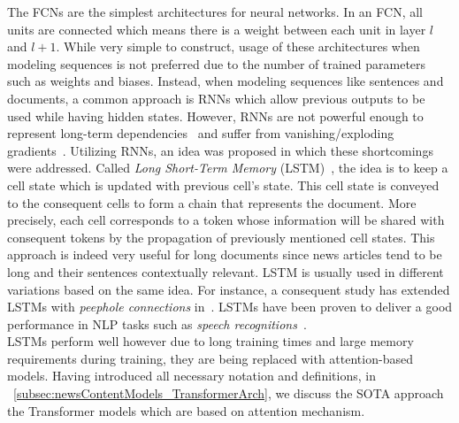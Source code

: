The FCNs are the simplest architectures for neural networks. In an FCN, all units are connected which means there is a weight between each unit in layer $l$ and $l+1$. While very simple to construct, usage of these architectures when modeling sequences is not preferred due to the number of trained parameters such as weights and biases. Instead, when modeling sequences like sentences and documents, a common approach is RNNs which allow previous outputs to be used while having hidden states. However, RNNs are not powerful enough to represent long-term dependencies~\parencite{LearningLongTermDependenciesHard_Bengio} and suffer from vanishing/exploding gradients~\parencite{OnTheDifficultyOfTrainingRNNs_Pascanu}. Utilizing RNNs, an idea was proposed in which these shortcomings were addressed. Called \emph{Long Short-Term Memory} (LSTM)~\parencite{LSTM_Hochreiter}, the idea is to keep a cell state which is updated with previous cell's state. This cell state is conveyed to the consequent cells to form a chain that represents the document. More precisely, each cell corresponds to a token whose information will be shared with consequent tokens by the propagation of previously mentioned cell states. This approach is indeed very useful for long documents since news articles tend to be long and their sentences contextually relevant. LSTM is usually used in different variations based on the same idea. For instance, a consequent study has extended LSTMs with \emph{peephole connections} in~\parencite{LSTMPeephole_Gers}. LSTMs have been proven to deliver a good performance in NLP tasks such as \emph{speech recognitions}~\parencite{AchievingHumanParityinConvSR_Wayne}.\\
LSTMs perform well however due to long training times and large memory requirements during training, they are being replaced with attention-based models. Having introduced all necessary notation and definitions, in ~\ref{subsec:newsContentModels_TransformerArch}, we discuss the SOTA approach the Transformer models which are based on attention mechanism.

